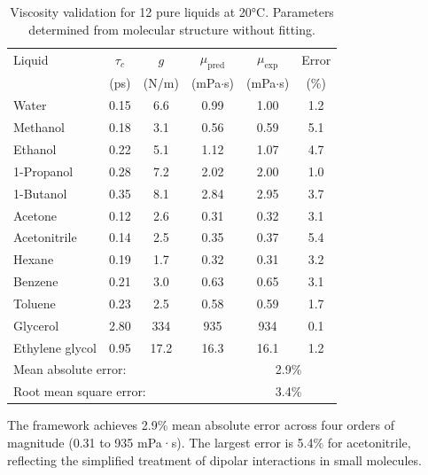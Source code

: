 \documentclass[twocolumn,superscriptaddress,prb,10pt]{revtex4-2}
\begin{document}
\begin{table}[htbp]
\centering
\caption{Viscosity validation for 12 pure liquids at 20°C. Parameters determined from molecular structure without fitting.}
\label{tab:viscosity_validation}
\begin{ruledtabular}
\begin{tabular}{lccccc}
Liquid & $\tau_c$ & $g$ & $\mu_{\text{pred}}$ & $\mu_{\text{exp}}$ & Error \\
       & (ps) & (N/m) & (mPa$\cdot$s) & (mPa$\cdot$s) & (\%) \\
\hline
Water          & 0.15 & 6.6  & 0.99   & 1.00   & 1.2 \\
Methanol       & 0.18 & 3.1  & 0.56   & 0.59   & 5.1 \\
Ethanol        & 0.22 & 5.1  & 1.12   & 1.07   & 4.7 \\
1-Propanol     & 0.28 & 7.2  & 2.02   & 2.00   & 1.0 \\
1-Butanol      & 0.35 & 8.1  & 2.84   & 2.95   & 3.7 \\
Acetone        & 0.12 & 2.6  & 0.31   & 0.32   & 3.1 \\
Acetonitrile   & 0.14 & 2.5  & 0.35   & 0.37   & 5.4 \\
Hexane         & 0.19 & 1.7  & 0.32   & 0.31   & 3.2 \\
Benzene        & 0.21 & 3.0  & 0.63   & 0.65   & 3.1 \\
Toluene        & 0.23 & 2.5  & 0.58   & 0.59   & 1.7 \\
Glycerol       & 2.80 & 334  & 935    & 934    & 0.1 \\
Ethylene glycol& 0.95 & 17.2 & 16.3   & 16.1   & 1.2 \\
\hline
\multicolumn{4}{l}{Mean absolute error:} & \multicolumn{2}{c}{2.9\%} \\
\multicolumn{4}{l}{Root mean square error:} & \multicolumn{2}{c}{3.4\%} \\
\end{tabular}
\end{ruledtabular}
\end{table}

The framework achieves 2.9\% mean absolute error across four orders of magnitude (0.31 to 935 mPa·s). The largest error is 5.4\% for acetonitrile, reflecting the simplified treatment of dipolar interactions in small molecules.
\end{document}

